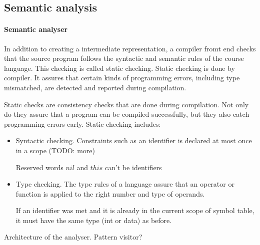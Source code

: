 \subsection{Semantic analysis}
  \paragraph{Semantic analyser}
In addition to creating a intermediate representation, a compiler fromt end checks that the source program follows the syntactic and semantic rules of the course language. This checking is called static checking. Static checking is done by compiler. It assures that certain kinds of programming errors, including type mismatched, are detected and reported during compilation.

Static checks are consistency checks that are done during compilation. Not only do they assure that a program can be compiled successfully, but they also catch programming errors early. Static checking includes:
\begin{itemize}
\item Syntactic checking. Constraints such as an identifier is declared at most once in a scope (TODO: more)

Reserved words $nil$ and $this$ can't be identifiers

\item Type checking. The type rules of a language assure that an operator or function is applied to the right number and type of operands.

If an identifier was met and it is already in the current scope of symbol table, it must have the same type (int or data) as before.
\end{itemize}

 Architecture of the analyser. Pattern visitor?


